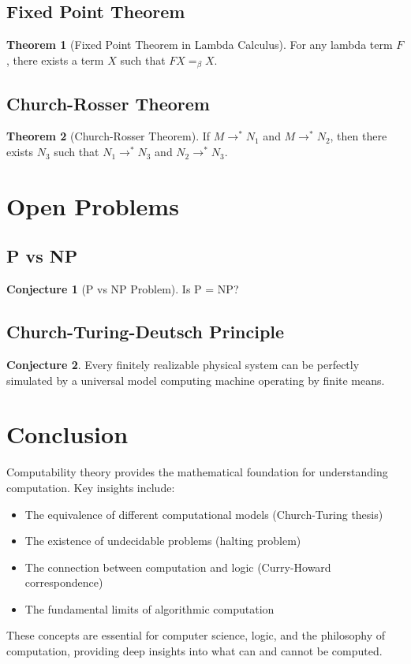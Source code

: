 \documentclass[11pt]{article}
\theoremstyle{definition}
\newtheorem{theorem}{Theorem}[section]
\newtheorem{conjecture}{Conjecture}[section]
\begin{document}
\subsection{Fixed Point Theorem}
\begin{theorem}[Fixed Point Theorem in Lambda Calculus]
For any lambda term $F$, there exists a term $X$ such that $F X =_\beta X$.
\end{theorem}

\subsection{Church-Rosser Theorem}
\begin{theorem}[Church-Rosser Theorem]
If $M \to^* N_1$ and $M \to^* N_2$, then there exists $N_3$ such that $N_1 \to^* N_3$ and $N_2 \to^* N_3$.
\end{theorem}

\section{Open Problems}

\subsection{P vs NP}
\begin{conjecture}[P vs NP Problem]
Is P = NP?
\end{conjecture}

\subsection{Church-Turing-Deutsch Principle}
\begin{conjecture}
Every finitely realizable physical system can be perfectly simulated by a universal model computing machine operating by finite means.
\end{conjecture}

\section{Conclusion}

Computability theory provides the mathematical foundation for understanding computation. Key insights include:

\begin{itemize}
    \item The equivalence of different computational models (Church-Turing thesis)
    \item The existence of undecidable problems (halting problem)
    \item The connection between computation and logic (Curry-Howard correspondence)
    \item The fundamental limits of algorithmic computation
\end{itemize}

These concepts are essential for computer science, logic, and the philosophy of computation, providing deep insights into what can and cannot be computed.
\end{document}
